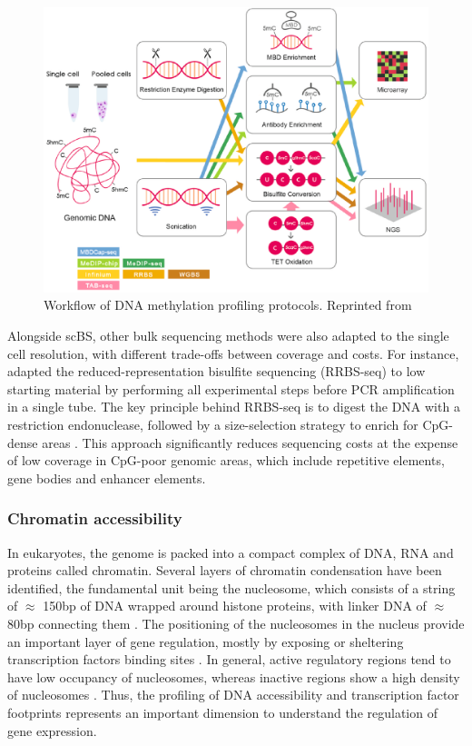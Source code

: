 \begin{figure}[H]
	\centering
	\includegraphics[width=0.8\linewidth]{methylation_protocols}
	\caption[]{Workflow of DNA methylation profiling protocols. Reprinted from \cite{Yong2016}}
	\label{fig:methylation_protocols}
\end{figure}


Alongside scBS, other bulk sequencing methods were also adapted to the single cell resolution, with different trade-offs between coverage and costs. For instance, \cite{Guo2015} adapted the reduced-representation bisulfite sequencing (RRBS-seq) to low starting material by performing all experimental steps before PCR amplification in a single tube. The key principle behind RRBS-seq is to digest the DNA with a restriction endonuclease, followed by a size-selection strategy to enrich for CpG-dense areas \cite{Meissner2005}. This approach significantly reduces sequencing costs at the expense of low coverage in CpG-poor genomic areas, which include repetitive elements, gene bodies and enhancer elements.

\subsubsection{Chromatin accessibility} \label{section:chromatin_accessibility}

In eukaryotes, the genome is packed into a compact complex of DNA, RNA and proteins called chromatin. Several layers of chromatin condensation have been identified, the fundamental unit being the nucleosome, which consists of a string of $\approx$  150bp of DNA wrapped around histone proteins, with linker DNA of $\approx$ 80bp connecting them \cite{Klemm2019,Tsompana2014}. The positioning of the nucleosomes in the nucleus provide an important layer of gene regulation, mostly by exposing or sheltering transcription factors binding sites \cite{Jiang2009}. In general, active regulatory regions tend to have low occupancy of nucleosomes, whereas inactive regions show a high density of nucleosomes \cite{Struhl2013}. Thus, the profiling of DNA accessibility and transcription factor footprints represents an important dimension to understand the regulation of gene expression.

